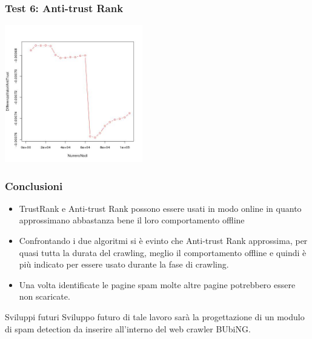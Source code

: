 \documentclass{beamer}
\begin{document}
\begin{frame}
\frametitle{Test 6: Anti-trust Rank}
\begin{center}
 \includegraphics[height=6cm]{immagini/test6/averageCompleteTest_antitrust_62}
\end{center}
\end{frame}
\begin{frame}
 \frametitle{Conclusioni}
 \begin{itemize}
  \item TrustRank e Anti-trust Rank possono essere usati in modo online in quanto approssimano abbastanza bene il loro comportamento offline
  \item Confrontando i due algoritmi si è evinto che Anti-trust Rank approssima, per quasi tutta la durata del crawling, meglio il comportamento offline e quindi è più indicato per essere usato durante la fase di crawling.
  \item Una volta identificate le pagine spam molte altre pagine potrebbero essere non scaricate.
   \end{itemize}
  \begin{block}{Sviluppi futuri}
    Sviluppo futuro di tale lavoro sarà la progettazione di un modulo di spam detection da inserire all’interno del web crawler BUbiNG.
  \end{block}
\end{frame}
\end{document}
